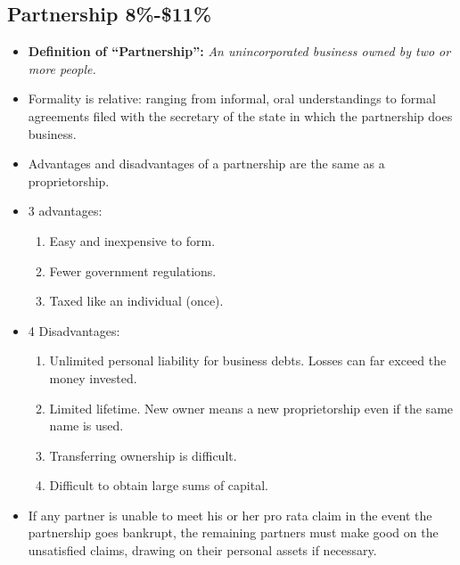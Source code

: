 \documentclass{article}
\renewcommand{\termdefinition}[2]{
    \textbf{Definition of ``#1'':} \emph{#2}
}
\begin{document}
\subsection{Partnership 8\%-\$11\%}
\begin{itemize}
    \item \termdefinition{Partnership}{ An unincorporated business owned by two or more people.} 
    \item Formality is relative: ranging from informal, oral understandings to formal agreements filed with the secretary of the state in which the partnership does business.
    \item Advantages and disadvantages of a partnership are the same as a proprietorship.
    \item 3 advantages:
        \begin{enumerate}
            \item Easy and inexpensive to form.
            \item Fewer government regulations. 
            \item Taxed like an individual (once). 
        \end{enumerate}
    
    \item 4 Disadvantages:
        \begin{enumerate}
            \item Unlimited personal liability for business debts. Losses can far exceed the money invested. 
            \item Limited lifetime. New owner means a new proprietorship even if the same name is used. 
            \item Transferring ownership is difficult. 
            \item Difficult to obtain large sums of capital. 
        \end{enumerate}
    
    \item If any partner is unable to meet his or her pro rata claim in the event the partnership goes bankrupt, the remaining partners must make good on the unsatisfied claims, drawing on their personal assets if necessary.
\end{itemize}
\end{document}
